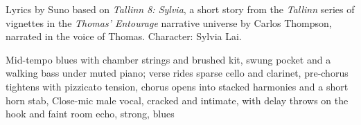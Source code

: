 
\begin{notes}
Lyrics by Suno based on \emph{Tallinn 8: Sylvia}, a short story from the \emph{Tallinn} series of vignettes in the \emph{Thomas’ Entourage} narrative universe by Carlos Thompson, narrated in the voice of Thomas. Character: Sylvia Lai.
\end{notes}
\begin{style}
Mid-tempo blues with chamber strings and brushed kit, swung pocket and a walking bass under muted piano; verse rides sparse cello and clarinet, pre-chorus tightens with pizzicato tension, chorus opens into stacked harmonies and a short horn stab, Close-mic male vocal, cracked and intimate, with delay throws on the hook and faint room echo, strong, blues
\end{style}
